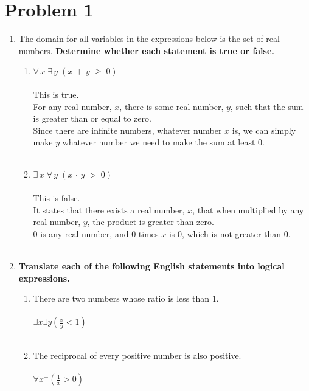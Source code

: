 \documentclass{amsart}
\theoremstyle{definition}
\theoremstyle{Exercise}
\theoremstyle{remark}
\theoremstyle{rule}
\numberwithin{equation}{section}
\begin{document}
\section*{Problem 1}
\begin{enumerate}[label=(\alph*)]
\item The domain for all variables in the expressions below is the set of real numbers. {\bf Determine whether each statement is true or false.}
\begin{enumerate}[label=(\roman*)]
  \item $\forall\, x\; \exists \,y\;(x\,+\,y\;\geq \;0)$
\\\\
  This is true.\\
  For any real number, $x$, there is some real number, $y$, such that the sum is greater than or equal to zero.\\
  Since there are infinite numbers, whatever number $x$ is, we can simply make $y$ whatever number we need to make the sum at least 0.
\\\\
  \item $\exists \, x\; \forall \,y\;(x\,\cdot\,y\;>\; 0)$
   \\\\
  This is false.\\
  It states that there exists a real number, $x$, that when multiplied by any real number, $y$, the product is greater than zero.\\
  0 is any real number, and 0 times $x$ is 0, which is not greater than 0.
\\\\
\end{enumerate}

\item {\bf Translate each of the following English statements into logical expressions.}
\begin{enumerate}[label=(\roman*)]
  \item There are two numbers whose ratio is less than $1$.
   \\\\
  $\exists x \exists y (\frac{x}{y} < 1)$
\\\\
  \item The reciprocal of every positive number is also positive.
   \\\\
  $\forall x^+(\frac{1}{x} > 0)$
\\\\
  \end{enumerate}
  \end{enumerate}
  \newpage
\end{document}
